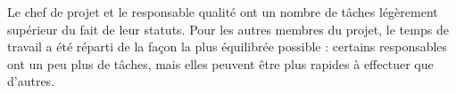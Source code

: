Le chef de projet et le responsable qualité ont un nombre de tâches légèrement supérieur du fait de leur statuts. Pour les autres membres du projet, le temps de travail a été réparti de la façon la plus équilibrée possible : certains responsables ont un peu plus de tâches, mais elles peuvent être plus rapides à effectuer que d’autres.
